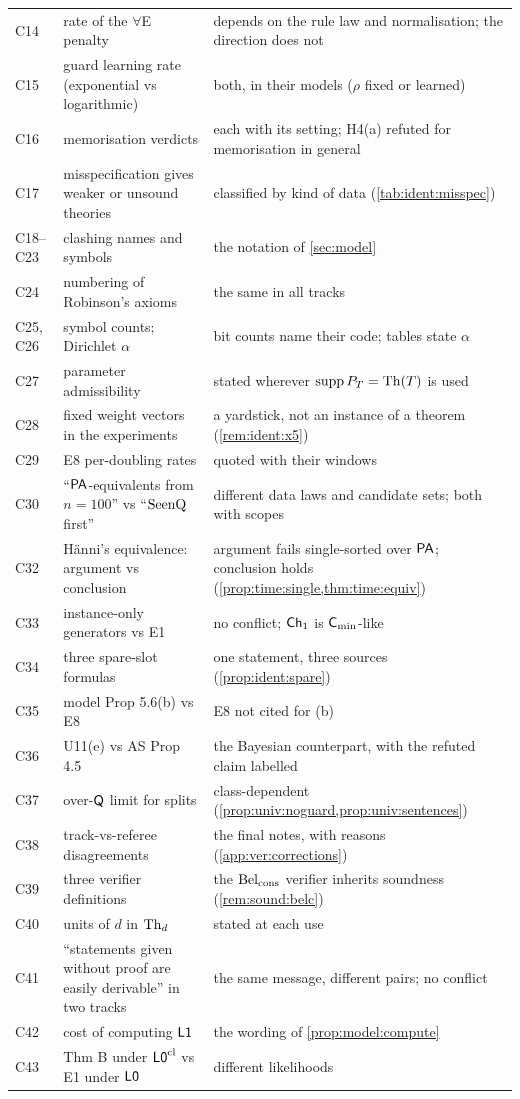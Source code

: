 {\begin{longtable}{@{}l>{\raggedright\arraybackslash}p{6.0cm}>{\raggedright\arraybackslash}p{7.7cm}@{}}
C14 & rate of the $\forall$E penalty & depends on the rule law and normalisation; the direction does not\\
C15 & guard learning rate (exponential vs logarithmic) & both, in their models ($\rho$ fixed or learned)\\
C16 & memorisation verdicts & each with its setting; H4(a) refuted for memorisation in general\\
C17 & misspecification gives weaker or unsound theories & classified by kind of data (\cref{tab:ident:misspec})\\
C18--C23 & clashing names and symbols & the notation of \cref{sec:model}\\
C24 & numbering of Robinson's axioms & the same in all tracks\\
C25, C26 & symbol counts; Dirichlet $\alpha$ & bit counts name their code; tables state $\alpha$\\
C27 & parameter admissibility & stated wherever $\operatorname{supp}P_T=\mathrm{Th}(T)$ is used\\
C28 & fixed weight vectors in the experiments & a yardstick, not an instance of a theorem (\cref{rem:ident:x5})\\
C29 & E8 per-doubling rates & quoted with their windows\\
C30 & ``$\mathsf{PA}$-equivalents from $n=100$'' vs ``$\mathrm{SeenQ}$ first'' & different data laws and candidate sets; both with scopes\\
C32 & H\"anni's equivalence: argument vs conclusion & argument fails single-sorted over $\mathsf{PA}$; conclusion holds (\cref{prop:time:single,thm:time:equiv})\\
C33 & instance-only generators vs E1 & no conflict; $\mathsf{Ch}_{1}$ is $\mathsf{C}_{\min}$-like\\
C34 & three spare-slot formulas & one statement, three sources (\cref{prop:ident:spare})\\
C35 & model Prop 5.6(b) vs E8 & E8 not cited for (b)\\
C36 & U11(e) vs AS Prop 4.5 & the Bayesian counterpart, with the refuted claim labelled\\
C37 & over-$\mathsf{Q}$ limit for splits & class-dependent (\cref{prop:univ:noguard,prop:univ:sentences})\\
C38 & track-vs-referee disagreements & the final notes, with reasons (\cref{app:ver:corrections})\\
C39 & three verifier definitions & the $\mathrm{Bel}_{\mathrm{cons}}$ verifier inherits soundness (\cref{rem:sound:belc})\\
C40 & units of $d$ in $\mathrm{Th}_d$ & stated at each use\\
C41 & ``statements given without proof are easily derivable'' in two tracks & the same message, different pairs; no conflict\\
C42 & cost of computing $\mathord{\mathsf{L1}}$ & the wording of \cref{prop:model:compute}\\
C43 & Thm B under $\mathord{\mathsf{L0}}^{\mathrm{cl}}$ vs E1 under $\mathord{\mathsf{L0}}$ & different likelihoods\\
\end{longtable}
}

